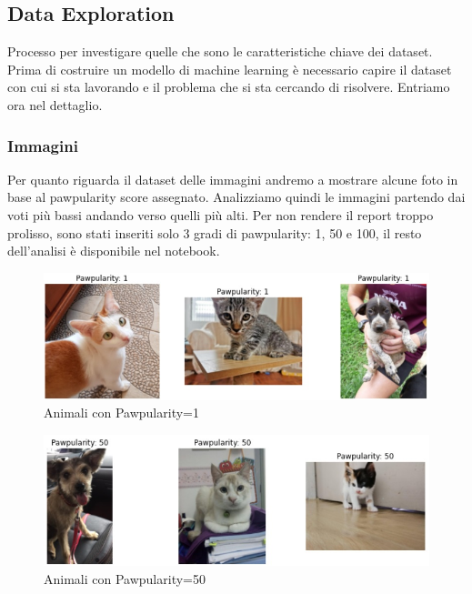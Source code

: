    
    \subsection{Data Exploration}
    Processo per investigare quelle che sono le caratteristiche chiave dei dataset. Prima di costruire un modello di machine learning è necessario capire il dataset con cui si sta lavorando e il problema che si sta cercando di risolvere. Entriamo ora nel dettaglio.

    \subsubsection{Immagini}
    Per quanto riguarda il dataset delle immagini andremo a mostrare alcune foto in base al pawpularity score assegnato.
    Analizziamo quindi le immagini partendo dai voti più bassi andando verso quelli più alti. Per non rendere il report troppo prolisso, sono stati inseriti solo 3 gradi di pawpularity: 1, 50 e 100, il resto dell'analisi è disponibile nel notebook.
    \begin{figure}[H]
        \centering
        \includegraphics[scale=0.5]{Plot/pawpularity_1.jpg}
        \caption{Animali con Pawpularity=1}
        \label{fig:paw_10}
    \end{figure}

    \begin{figure}[H]
        \centering
        \includegraphics[scale=0.5]{Plot/pawpularity_50.jpg}
        \caption{Animali con Pawpularity=50}
        \label{fig:paw_50}
    \end{figure}

